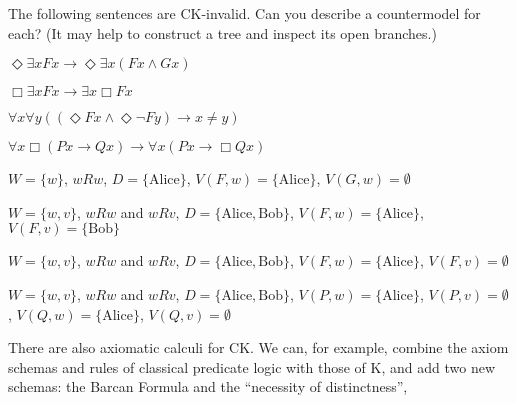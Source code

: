 \begin{exercise}
  The following sentences are CK-invalid. Can you describe a countermodel for
  each? (It may help to construct a tree and inspect its open branches.)
  \begin{exlist}
    \item $\Diamond \exists x Fx \to \Diamond\exists x(Fx \land Gx)$
    \item $\Box \exists x Fx \to \exists x \Box Fx$
    \item
    $\forall x \forall y ((\Diamond Fx \land \Diamond \neg Fy) \to x\!\not=\!y)$
    \item $\forall x \Box (Px \to Qx) \to \forall x (Px \to \Box Qx)$
  \end{exlist}
\end{exercise}
\begin{solution}
  \begin{sollist}
    \item $W=\{ w \}$, $wRw$, $D = \{ \text{Alice} \}$,
    $V(F,w) = \{ \text{Alice} \}$, $V(G,w) = \emptyset$
    \item $W=\{ w,v \}$, $wRw$ and $wRv$, $D = \{ \text{Alice}, \text{Bob} \}$,
    $V(F,w) = \{ \text{Alice} \}$, $V(F,v) = \{ \text{Bob} \}$
    \item $W=\{ w,v \}$, $wRw$ and $wRv$, $D = \{ \text{Alice}, \text{Bob} \}$,
    $V(F,w) = \{ \text{Alice} \}$, $V(F,v) = \emptyset$
    \item $W=\{ w,v \}$, $wRw$ and $wRv$, $D = \{ \text{Alice}, \text{Bob} \}$,
    $V(P,w) = \{ \text{Alice} \}$, $V(P,v) = \emptyset$,
    $V(Q,w) = \{ \text{Alice} \}$, $V(Q,v) = \emptyset$
  \end{sollist}
\end{solution}

There are also axiomatic calculi for CK. We can, for example, combine the axiom
schemas and rules of classical predicate logic with those of K, and add two new
schemas: the Barcan Formula  and the ``necessity of distinctness'',
%

